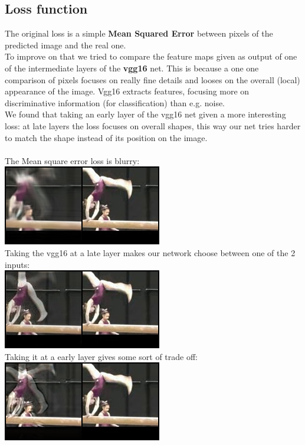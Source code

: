 \documentclass[11pt, a4paper]{article}
\begin{document}
	\subsection{Loss function}
	The original loss is a simple \textbf{Mean Squared Error} between pixels of the predicted image and the real one. \\
	To improve on that we tried to compare the feature maps given as output of one of the intermediate layers of the \textbf{vgg16} net. This is because a one one comparison of pixels focuses on really fine details and looses on the overall (local) appearance of the image. Vgg16 extracts features, focusing more on discriminative information (for classification) than e.g. noise. \\
	We found that taking an early layer of the vgg16 net given a more interesting loss: at late layers the loss focuses on overall shapes, this way our net tries harder to match the shape instead of its position on the image. \\ \\
	The Mean square error loss is blurry:\\
	\includegraphics{mse_loss2}\\
	Taking the vgg16 at a late layer makes our network choose between one of the 2 inputs: \\
	\includegraphics{vgg16_relu4_4_loss2}\\
	Taking it at a early layer gives some sort of trade off:\\
	\includegraphics{vgg16_relu2_1_loss2}\\
\end{document}
